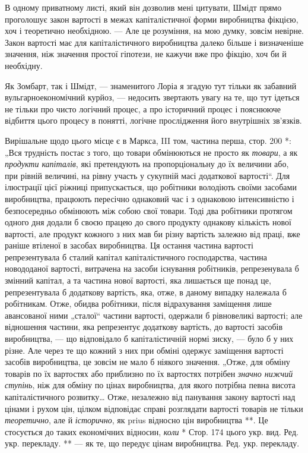 \parcont{}  %
В одному приватному листі, який він дозволив мені цитувати, Шмідт прямо проголошує закон вартості в межах капіталістичної форми
виробництва фікцією, хоч і теоретично необхідною. — Але це розуміння, на мою думку, зовсім невірне. Закон вартості має для
капіталістичного виробництва далеко більше і визначеніше значення, ніж значення простої гіпотези, не кажучи вже про фікцію,
хоч би й необхідну.

Як Зомбарт, так і Шмідт, — знаменитого Лоріа я згадую тут тільки як забавний вульгарноекономічний
курйоз, — недосить звертають увагу на те, що тут ідеться не тільки про чисто логічний процес, а про історичний процес і
пояснююче відбиття цього процесу в понятті, логічне прослідження його внутрішніх зв’язків.

Вирішальне щодо цього місце є в
Маркса, III том, частина перша, стор. 200 *: „Вся трудність постає з того, що товари обмінюються не просто як \emph{товари}, а як
\emph{продукти капіталів}, які претендують на пропорціональну до їх величини або, при рівній величині, на рівну участь у сукупній
масі додаткової вартості“.  Для ілюстрації цієї ріжниці припускається, що робітники володіють своїми засобами виробництва,
працюють пересічно однаковий час і з однаковою інтенсивністю і безпосередньо обмінюють між собою свої товари. Тоді два
робітники протягом одного дня додали б своєю працею до свого продукту однакову кількість нової вартості, але продукт кожного
з них мав би різну вартість залежно від праці, вже раніше втіленої в засобах виробництва. Ця остання частина вартості
репрезентувала б сталий капітал капіталістичного господарства, частина новододаної вартості, витрачена на засоби існування
робітників, репрезенувала б змінний капітал, а та частина нової вартості, яка лишається ще понад це, репрезентувала б
додаткову вартість, яка, отже, в даному випадку належала б робітникам. Отже, обидва робітники, після відрахування заміщення
лише авансованої ними „сталої“ частини вартості, одержали б рівновеликі вартості; але відношення частини, яка репрезентує
додаткову вартість, до
вартості засобів виробництва, — що відповідало б капіталістичній нормі зиску, — було б у них різне. Але через те що кожний з них
при обміні одержує заміщення вартості засобів виробництва, це зовсім не мало б ніякого значення. „Отже, для обміну
товарів по їх вартостях або приблизно по їх вартостях потрібен \emph{значно нижчий ступінь}, ніж для обміну по цінах виробництва,
для якого потрібна певна висота капіталістичного розвитку\dots{} Отже, незалежно від панування закону вартості над цінами і
рухом цін, цілком відповідає справі розглядати вартості товарів не тільки \emph{теоретично}, але й \emph{історично}, як prius відносно цін
виробництва **. Це стосується до таких економічних відносин, \emph{коли}
* Стор. 174 цього укр. вид. Ред. укр. перекладу. ** — як те, що передує цінам виробництва. Ред. укр. перекладу.
\parbreak{}  %
